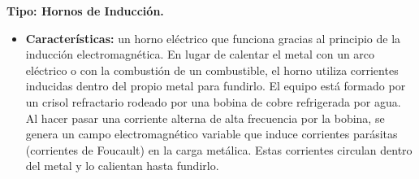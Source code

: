 \documentclass[12pt,a4paper]{article}
\begin{document}
\textbf{Tipo: Hornos de Inducción.}

\begin{itemize}
    \item \textbf{Características:} 
    un horno eléctrico que funciona gracias al principio de la inducción electromagnética. En lugar de calentar el metal con un arco eléctrico o con la combustión de un combustible, el horno utiliza corrientes inducidas dentro del propio metal para fundirlo.
    El equipo está formado por un crisol refractario rodeado por una bobina de cobre refrigerada por agua. Al hacer pasar una corriente alterna de alta frecuencia por la bobina, se genera un campo electromagnético variable que induce corrientes parásitas (corrientes de Foucault) en la carga metálica. Estas corrientes circulan dentro del metal y lo calientan hasta fundirlo.
\end{itemize}
\end{document}
